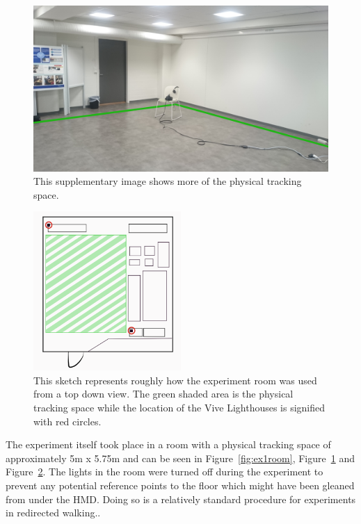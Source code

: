 \begin{figure}[tbph]
    \centering
    \includegraphics[width=1\textwidth]{figures/images/extraRoomImage.jpg}
    \caption[Supplementary Image of Experiment Environment]{This supplementary image shows more of the physical tracking space.}
    \label{fig:ex1roomImage2}
\end{figure}

\begin{figure}[tbph]
    \centering
    \includegraphics[width=0.5\textwidth]{figures/images/topDownRoom.png}
    \caption[Top Down Representation of Experiment Environment]{This sketch represents roughly how the experiment room was used from a top down view. The green shaded area is the physical tracking space while the location of the Vive Lighthouses is signified with red circles.}
    \label{fig:ex1roomTopDown}
\end{figure}

The experiment itself took place in a room with a physical tracking space of approximately 5m x 5.75m and can be seen in Figure~\ref{fig:ex1room}, Figure~\ref{fig:ex1roomImage2} and Figure~\ref{fig:ex1roomTopDown}. The lights in the room were turned off during the experiment to prevent any potential reference points to the floor which might have been gleaned from under the HMD. Doing so is a relatively standard procedure for experiments in redirected walking.. 

